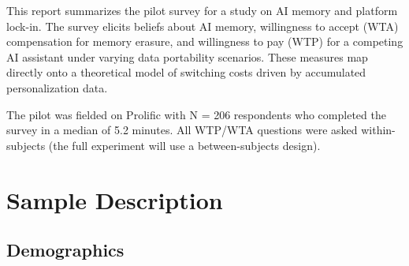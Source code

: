 \documentclass[
]{article}
\begin{document}
This report summarizes the pilot survey for a study on AI memory and
platform lock-in. The survey elicits beliefs about AI memory,
willingness to accept (WTA) compensation for memory erasure, and
willingness to pay (WTP) for a competing AI assistant under varying data
portability scenarios. These measures map directly onto a theoretical
model of switching costs driven by accumulated personalization data.

The pilot was fielded on Prolific with N = 206 respondents who completed
the survey in a median of 5.2 minutes. All WTP/WTA questions were asked
within-subjects (the full experiment will use a between-subjects
design).

\section{Sample Description}\label{sample-description}

\subsection{Demographics}\label{demographics}
\end{document}
